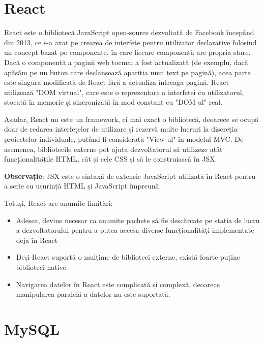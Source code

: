 \section{React}

React este o bibliotecă JavaScript open-source dezvoltată de Facebook începând din 2013, ce s-a axat pe crearea de interfețe pentru utilizator declarative folosind un concept bazat pe componente, în care fiecare componentă are propria stare.\newline
Dacă o componentă a paginii web tocmai a fost actualizată (de exemplu, dacă apăsăm pe un buton care declanșează apariția unui text pe pagină), acea parte este singura modificată de React fără a actualiza întreaga pagină. React utilizează "DOM virtual", care este o reprezentare a interfeței cu utilizatorul, stocată în memorie și sincronizată în mod constant cu "DOM-ul" real.\newline

Așadar, React nu este un framework, ci mai exact o bibliotecă, deoarece se ocupă doar de redarea interfețelor de utilizare și rezervă multe lucruri la discreția proiectelor individuale, putând fi considerată "View-ul" în modelul MVC. De asemenea, bibliotecile externe pot ajuta dezvoltatorul să utilizeze atât funcționalitățile HTML, cât și cele CSS și să le construiască în JSX.\newline

\textbf{Observație}: JSX este o sintaxă de extensie JavaScript utilizată în React pentru a scrie cu ușurință HTML și JavaScript împreună.
\newline


Totuși, React are anumite limitări:

\begin{itemize}
	\item{Adesea, devine necesar ca anumite pachete să fie descărcate pe stația de lucru a dezvoltatorului pentru a putea accesa diverse funcționalități implementate deja în React}
	\item{Deși React suportă o mulțime de biblioteci externe, există foarte puține biblioteci native.}
	\item{Navigarea datelor în React este complicată și complexă, deoarece manipularea paralelă a datelor nu este suportată.}
	\newline
\end{itemize}

\section{MySQL}

